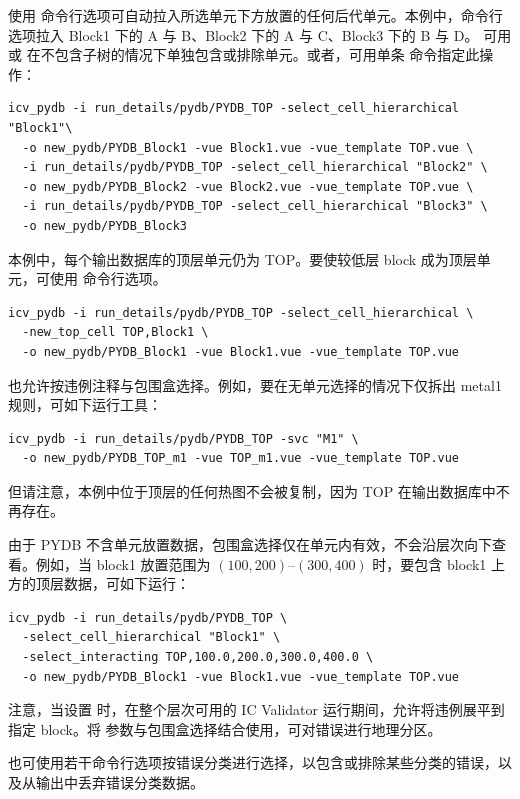 使用  命令行选项可自动拉入所选单元下方放置的任何后代单元。本例中，命令行选项拉入 Block1 下的 A 与 B、Block2 下的 A 与 C、Block3 下的 B 与 D。
可用  或  在不包含子树的情况下单独包含或排除单元。或者，可用单条  命令指定此操作：
\begin{lstlisting}[style=shell]
icv_pydb -i run_details/pydb/PYDB_TOP -select_cell_hierarchical "Block1"\
  -o new_pydb/PYDB_Block1 -vue Block1.vue -vue_template TOP.vue \
  -i run_details/pydb/PYDB_TOP -select_cell_hierarchical "Block2" \
  -o new_pydb/PYDB_Block2 -vue Block2.vue -vue_template TOP.vue \
  -i run_details/pydb/PYDB_TOP -select_cell_hierarchical "Block3" \
  -o new_pydb/PYDB_Block3
\end{lstlisting}

本例中，每个输出数据库的顶层单元仍为 TOP。要使较低层 block 成为顶层单元，可使用  命令行选项。
\begin{lstlisting}[style=shell]
icv_pydb -i run_details/pydb/PYDB_TOP -select_cell_hierarchical \
  -new_top_cell TOP,Block1 \
  -o new_pydb/PYDB_Block1 -vue Block1.vue -vue_template TOP.vue
\end{lstlisting}

也允许按违例注释与包围盒选择。例如，要在无单元选择的情况下仅拆出 metal1 规则，可如下运行工具：
\begin{lstlisting}[style=shell]
icv_pydb -i run_details/pydb/PYDB_TOP -svc "M1" \
  -o new_pydb/PYDB_TOP_m1 -vue TOP_m1.vue -vue_template TOP.vue
\end{lstlisting}

但请注意，本例中位于顶层的任何热图不会被复制，因为 TOP 在输出数据库中不再存在。

由于 PYDB 不含单元放置数据，包围盒选择仅在单元内有效，不会沿层次向下查看。例如，当 block1 放置范围为 $(100,200)$--$(300,400)$ 时，要包含 block1 上方的顶层数据，可如下运行：
\begin{lstlisting}[style=shell]
icv_pydb -i run_details/pydb/PYDB_TOP \
  -select_cell_hierarchical "Block1" \
  -select_interacting TOP,100.0,200.0,300.0,400.0 \
  -o new_pydb/PYDB_Block1 -vue Block1.vue -vue_template TOP.vue
\end{lstlisting}

注意，当设置  时，在整个层次可用的 IC Validator 运行期间，允许将违例展平到指定 block。将  参数与包围盒选择结合使用，可对错误进行地理分区。

也可使用若干命令行选项按错误分类进行选择，以包含或排除某些分类的错误，以及从输出中丢弃错误分类数据。

